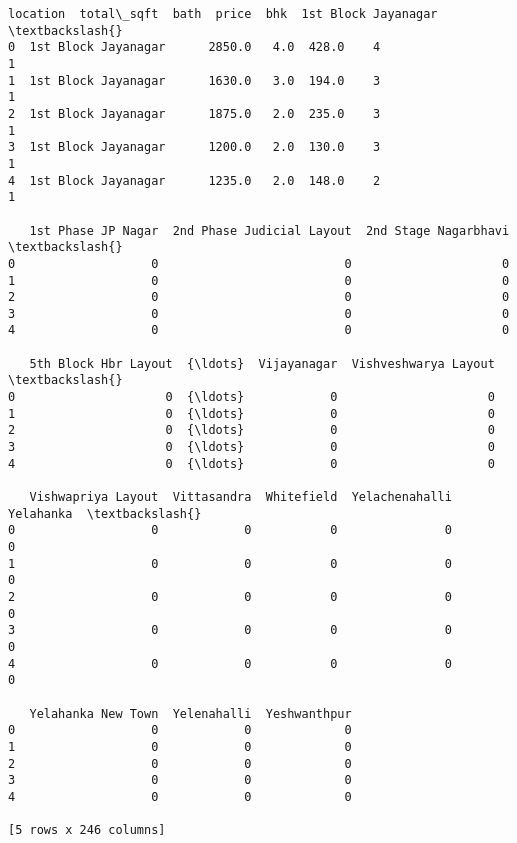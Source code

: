 \documentclass[11pt]{article}
\makeatletter
\newcommand{\boxspacing}{\kern\kvtcb@left@rule\kern\kvtcb@boxsep}
\newcommand{\prompt}[4]{
        {\ttfamily\llap{{\color{#2}[#3]:\hspace{3pt}#4}}\vspace{-\baselineskip}}
    }
\makeatother
\begin{document}
            \begin{tcolorbox}[breakable, size=fbox, boxrule=.5pt, pad at break*=1mm, opacityfill=0]
\prompt{Out}{outcolor}{52}{\boxspacing}
\begin{Verbatim}[commandchars=\\\{\}]
              location  total\_sqft  bath  price  bhk  1st Block Jayanagar  \textbackslash{}
0  1st Block Jayanagar      2850.0   4.0  428.0    4                    1
1  1st Block Jayanagar      1630.0   3.0  194.0    3                    1
2  1st Block Jayanagar      1875.0   2.0  235.0    3                    1
3  1st Block Jayanagar      1200.0   2.0  130.0    3                    1
4  1st Block Jayanagar      1235.0   2.0  148.0    2                    1

   1st Phase JP Nagar  2nd Phase Judicial Layout  2nd Stage Nagarbhavi  \textbackslash{}
0                   0                          0                     0
1                   0                          0                     0
2                   0                          0                     0
3                   0                          0                     0
4                   0                          0                     0

   5th Block Hbr Layout  {\ldots}  Vijayanagar  Vishveshwarya Layout  \textbackslash{}
0                     0  {\ldots}            0                     0
1                     0  {\ldots}            0                     0
2                     0  {\ldots}            0                     0
3                     0  {\ldots}            0                     0
4                     0  {\ldots}            0                     0

   Vishwapriya Layout  Vittasandra  Whitefield  Yelachenahalli  Yelahanka  \textbackslash{}
0                   0            0           0               0          0
1                   0            0           0               0          0
2                   0            0           0               0          0
3                   0            0           0               0          0
4                   0            0           0               0          0

   Yelahanka New Town  Yelenahalli  Yeshwanthpur
0                   0            0             0
1                   0            0             0
2                   0            0             0
3                   0            0             0
4                   0            0             0

[5 rows x 246 columns]
\end{Verbatim}
\end{tcolorbox}
        
\end{document}
